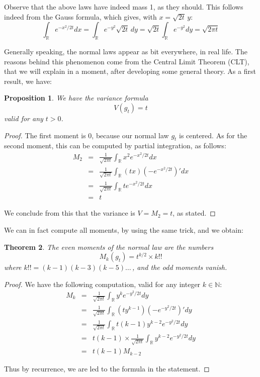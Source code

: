 \documentclass[12pt]{amsbook}
\newtheorem{theorem}{Theorem}[chapter]
\newtheorem{proposition}[theorem]{Proposition}
\begin{document}
Observe that the above laws have indeed mass 1, as they should. This follows indeed from the Gauss formula, which gives, with $x=\sqrt{2t}\,y$:
$$\int_\mathbb R e^{-x^2/2t}dx
=\int_\mathbb R e^{-y^2}\sqrt{2t}\,dy
=\sqrt{2t}\int_\mathbb R e^{-y^2}dy
=\sqrt{2\pi t}$$

Generally speaking, the normal laws appear as bit everywhere, in real life. The reasons behind this phenomenon come from the Central Limit Theorem (CLT), that we will explain in a moment, after developing some general theory. As a first result, we have:

\begin{proposition}
We have the variance formula
$$V(g_t)=t$$
valid for any $t>0$.
\end{proposition}

\begin{proof}
The first moment is 0, because our normal law $g_t$ is centered. As for the second moment, this can be computed by partial integration, as follows:
\begin{eqnarray*}
M_2
&=&\frac{1}{\sqrt{2\pi t}}\int_\mathbb Rx^2e^{-x^2/2t}dx\\
&=&\frac{1}{\sqrt{2\pi t}}\int_\mathbb R(tx)\left(-e^{-x^2/2t}\right)'dx\\
&=&\frac{1}{\sqrt{2\pi t}}\int_\mathbb Rte^{-x^2/2t}dx\\
&=&t
\end{eqnarray*}

We conclude from this that the variance is $V=M_2=t$, as stated.
\end{proof}

We can in fact compute all moments, by using the same trick, and we obtain:

\begin{theorem}
The even moments of the normal law are the numbers
$$M_k(g_t)=t^{k/2}\times k!!$$
where $k!!=(k-1)(k-3)(k-5)\ldots\,$, and the odd moments vanish. 
\end{theorem}

\begin{proof}
We have the following computation, valid for any integer $k\in\mathbb N$:
\begin{eqnarray*}
M_k
&=&\frac{1}{\sqrt{2\pi t}}\int_\mathbb Ry^ke^{-y^2/2t}dy\\
&=&\frac{1}{\sqrt{2\pi t}}\int_\mathbb R(ty^{k-1})\left(-e^{-y^2/2t}\right)'dy\\
&=&\frac{1}{\sqrt{2\pi t}}\int_\mathbb Rt(k-1)y^{k-2}e^{-y^2/2t}dy\\
&=&t(k-1)\times\frac{1}{\sqrt{2\pi t}}\int_\mathbb Ry^{k-2}e^{-y^2/2t}dy\\
&=&t(k-1)M_{k-2}
\end{eqnarray*}

Thus by recurrence, we are led to the formula in the statement.
\end{proof}
\end{document}
